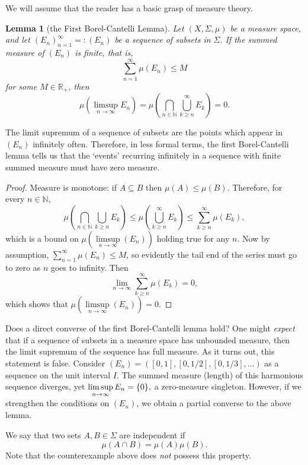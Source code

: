 \documentclass[12pt, letterpaper, oneside]{book}
\newcommand{\R}{\mathbb{R}}
\newcommand{\N}{\mathbb{N}}
\DeclarePairedDelimiter{\set}{\lbrace}{\rbrace}
\theoremstyle{plain}
\newtheorem{lemma}[theorem]{Lemma}
\theoremstyle{definition}
\theoremstyle{remark}
\begin{document}
We will assume that the reader has a basic grasp of measure theory.
\begin{lemma}[the First Borel-Cantelli Lemma]
Let $(X, \Sigma, \mu)$ be a measure space, and let $(E_n)^{\infty}_{n=1} =: (E_n)$ be a sequence of subsets in $\Sigma.$ If the summed measure of $(E_n)$ is finite, that is,
\[
\sum_{n=1}^{\infty} \mu(E_n) \leq M
\]
for some $M \in \R_+$, then
\[
\mu (\limsup \limits_{n \to \infty} E_n) = \mu (\bigcap_{n \in \N} \bigcup_{k \geq n}^\infty E_k) = 0.
\]
\end{lemma}
The limit supremum of a sequence of subsets are the points which appear in $(E_n)$ infinitely often. Therefore, in less formal terms, the first Borel-Cantelli lemma tells us that the `events' recurring infinitely in a sequence with finite summed measure must have zero measure. 
\begin{proof}
Measure is monotone: if $A \subseteq B$ then $\mu(A) \leq \mu(B).$ Therefore, for every $n \in \N,$
\[
\mu(\bigcap_{n \in \N} \bigcup_{k \geq n} E_k) \leq \mu(\bigcup_{k \geq n}^\infty E_k) \leq \sum_{k \geq n}^{\infty} \mu (E_k),
\]
which is a bound on $\mu(\limsup \limits_{n\to\infty}(E_n))$ holding true for any $n$. Now by assumption, $\sum_{n=1}^{\infty} \mu(E_n) \leq M$, so evidently the tail end of the series must go to zero as $n$ goes to infinity. Then
\[
\lim \limits_{n \to \infty} \sum_{k \geq n}^{\infty} \mu (E_k) = 0,
\]
which shows that $\mu(\limsup \limits_{n\to\infty}(E_n)) = 0.$
\end{proof}

Does a direct converse of the first Borel-Cantelli lemma hold? One might \textit{expect} that if a sequence of subsets in a measure space has unbounded measure, then the limit supremum of the sequence has full measure. As it turns out, this statement is false. Consider $(E_n) = ([0,1], [0, 1/2], [0,1/3], \ldots)$ as a sequence on the unit interval $I$. The summed measure (length) of this harmonious sequence diverges, yet $\limsup\limits_{n \to \infty} E_n = \set{0},$ a zero-measure singleton. However, if we strengthen the conditions on $(E_n)$, we obtain a partial converse to the above lemma.

We say that two sets $A,B \in \Sigma$ are independent if 
\[
\mu(A \cap B) = \mu(A)\mu(B).
\]
Note that the counterexample above does \textit{not} possess this property.
\end{document}

